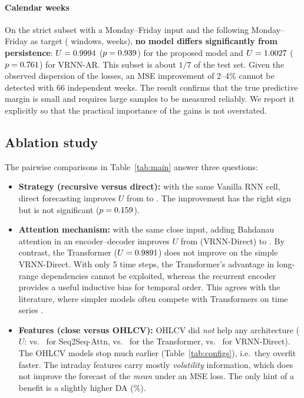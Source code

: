 \paragraph{Calendar weeks}
On the strict subset with a Monday--Friday input and the following Monday--Friday as target (\NcalTest{} windows, \CwWeeks{} weeks), \textbf{no model differs significantly from persistence}: $U=0.9994$ ($p=0.939$) for the proposed model and $U=1.0027$ ($p=0.761$) for VRNN-AR. This subset is about $1/7$ of the test set. Given the observed dispersion of the losses, an MSE improvement of 2--4\% cannot be detected with 66 independent weeks. The result confirms that the true predictive margin is small and requires large samples to be measured reliably. We report it explicitly so that the practical importance of the gains is not overstated.

\subsection{Ablation study}
The pairwise comparisons in Table~\ref{tab:main} answer three questions:
\begin{itemize}[leftmargin=*]
  \item \textbf{Strategy (recursive versus direct):} with the same Vanilla RNN cell, direct forecasting improves $U$ from \VrnnU{} to \DirCloseU{}. The improvement has the right sign but is not significant ($p=0.159$).
  \item \textbf{Attention mechanism:} with the same close input, adding Bahdanau attention in an encoder--decoder improves $U$ from \DirCloseU{} (VRNN-Direct) to \SsCloseU. By contrast, the Transformer ($U=0.9891$) does not improve on the simple VRNN-Direct. With only 5 time steps, the Transformer's advantage in long-range dependencies cannot be exploited, whereas the recurrent encoder provides a useful inductive bias for temporal order. This agrees with the literature, where simpler models often compete with Transformers on time series \cite{zeng2023}.
  \item \textbf{Features (close versus OHLCV):} OHLCV did \emph{not} help any architecture ($U$: \SsOhlcvU{} vs.\ \SsCloseU{} for Seq2Seq-Attn, \TrOhlcvU{} vs.\ \TrCloseU{} for the Transformer, \DirOhlcvU{} vs.\ \DirCloseU{} for VRNN-Direct). The OHLCV models stop much earlier (Table~\ref{tab:configs}), i.e.\ they overfit faster. The intraday features carry mostly \emph{volatility} information, which does not improve the forecast of the \emph{mean} under an MSE loss. The only hint of a benefit is a slightly higher DA (\SsOhlcvDA\%).
\end{itemize}

